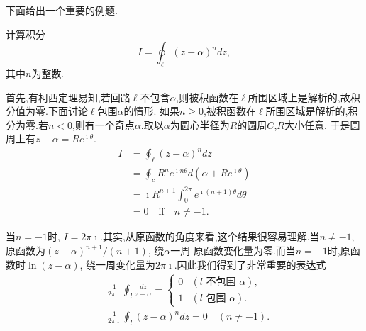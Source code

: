 下面给出一个重要的例题.
\begin{example}
计算积分\[ I = \oint_\ell (z-\alpha)^n dz, \]其中$n$为整数.
\label{ex:integral}
\end{example}
\begin{solution}
首先,有柯西定理易知,若回路$\ell$不包含$\alpha$,则被积函数在$\ell$所围区域上是解析的,故积分值为零.下面讨论$\ell$包围$\alpha$的情形.
如果$n\geq 0$,被积函数在$\ell$所围区域是解析的,积分为零.若$n<0$,则有一个奇点$\alpha$.取以$\alpha$为圆心半径为$R$的圆周$C$,$R$大小任意.
于是圆周上有$z-\alpha = Re^{\imath \theta}$.
$$
\begin{aligned}
    I &= \oint_\ell (z-\alpha)^n dz\\
     &= \oint_c R^n e^{\imath n \theta} d (\alpha + R e^{\imath \theta})\\
     & =  \imath R^{n+1} \int_0^{2\pi} e^{\imath (n+1)\theta}  d\theta \\
     & = 0 \quad \textrm{if} \quad n\neq -1.
\end{aligned}
$$

当$n = -1$时, $I = 2\pi \imath$.其实,从原函数的角度来看,这个结果很容易理解.当$n\neq -1$,原函数为$(z-\alpha)^{n+1}/(n+1)$, 绕$\alpha$一周
原函数变化量为零.而当$n=-1$时,原函数时$\ln(z-\alpha)$, 绕一周变化量为$2\pi \imath$.因此我们得到了非常重要的表达式
$$
    \begin{aligned}
        & \frac{1}{2 \pi \imath} \oint_l \frac{d z}{z-\alpha}= \begin{cases}0 & (l \text { 不包围 } \alpha), \\
        1 & (l \text { 包围 } \alpha) . \end{cases} \\
        & \frac{1}{2 \pi \imath} \oint_l(z-\alpha)^n d z=0 \quad(n \neq-1) .
        \end{aligned}
$$
\end{solution}